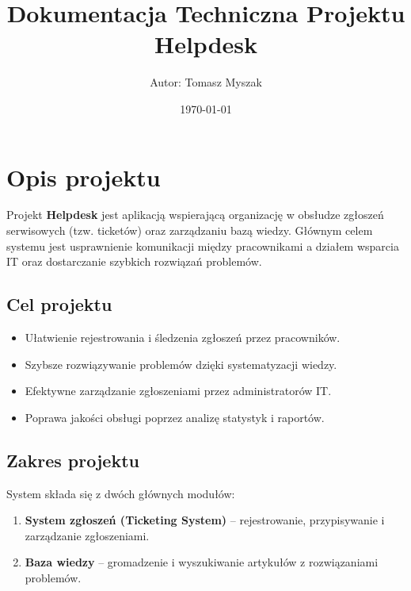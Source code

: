 \documentclass[a4paper,12pt]{article}
\title{\textbf{Dokumentacja Techniczna Projektu Helpdesk}}
\author{Autor: Tomasz Myszak}
\date{\today}
\begin{document}
\maketitle

\tableofcontents
\newpage

\section{Opis projektu}
Projekt \textbf{Helpdesk} jest aplikacją wspierającą organizację w obsłudze zgłoszeń serwisowych (tzw. ticketów) oraz zarządzaniu bazą wiedzy. Głównym celem systemu jest usprawnienie komunikacji między pracownikami a działem wsparcia IT oraz dostarczanie szybkich rozwiązań problemów.

\subsection{Cel projektu}
\begin{itemize}
    \item Ułatwienie rejestrowania i śledzenia zgłoszeń przez pracowników.
    \item Szybsze rozwiązywanie problemów dzięki systematyzacji wiedzy.
    \item Efektywne zarządzanie zgłoszeniami przez administratorów IT.
    \item Poprawa jakości obsługi poprzez analizę statystyk i raportów.
\end{itemize}

\subsection{Zakres projektu}
System składa się z dwóch głównych modułów:
\begin{enumerate}
    \item \textbf{System zgłoszeń (Ticketing System)} -- rejestrowanie, przypisywanie i zarządzanie zgłoszeniami.
    \item \textbf{Baza wiedzy} -- gromadzenie i wyszukiwanie artykułów z rozwiązaniami problemów.
\end{enumerate}

\newpage

\end{document}
